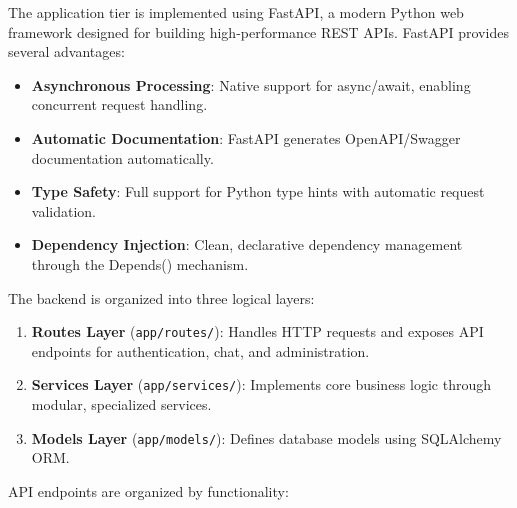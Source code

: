 The application tier is implemented using FastAPI, a modern Python web framework designed for building high-performance REST APIs. FastAPI provides several advantages:

\begin{itemize}
    \item \textbf{Asynchronous Processing}: Native support for async/await, enabling concurrent request handling.
    \item \textbf{Automatic Documentation}: FastAPI generates OpenAPI/Swagger documentation automatically.
    \item \textbf{Type Safety}: Full support for Python type hints with automatic request validation.
    \item \textbf{Dependency Injection}: Clean, declarative dependency management through the Depends() mechanism.
\end{itemize}

The backend is organized into three logical layers:

\begin{enumerate}
    \item \textbf{Routes Layer} (\texttt{app/routes/}): Handles HTTP requests and exposes API endpoints for authentication, chat, and administration.
    \item \textbf{Services Layer} (\texttt{app/services/}): Implements core business logic through modular, specialized services.
    \item \textbf{Models Layer} (\texttt{app/models/}): Defines database models using SQLAlchemy ORM.
\end{enumerate}

API endpoints are organized by functionality:

